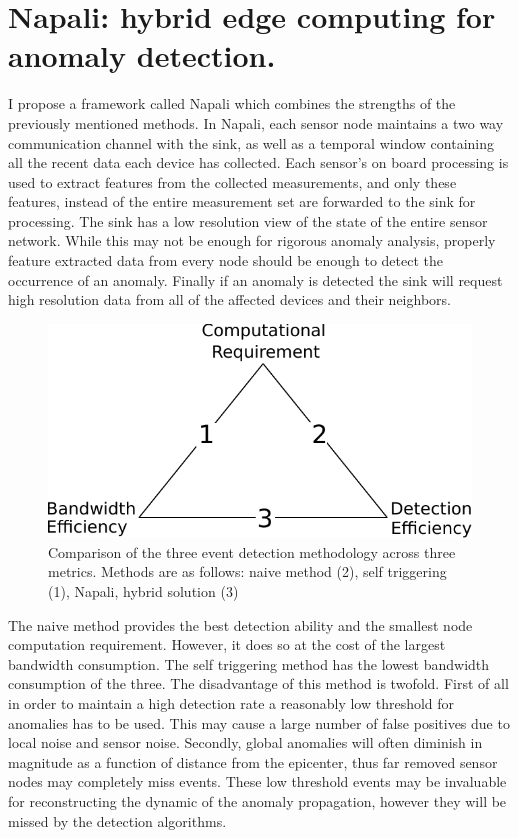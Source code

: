 \section{Napali: hybrid edge computing for anomaly detection.} \label{intro:section:napali}
  
I propose a framework called Napali which combines the strengths of the previously mentioned methods. In Napali, each sensor node maintains a two way communication channel with the sink, as well as a temporal window containing all the recent data each device has collected. Each sensor's on board processing is used to extract features from the collected measurements, and only these features, instead of the entire measurement set are forwarded to the sink for processing. The sink has a low resolution view of the state of the entire sensor network. While this may not be enough for rigorous anomaly analysis, properly feature extracted data from every node should be enough to detect the occurrence of an anomaly. Finally if an anomaly is detected the sink will request high resolution data from all of the affected devices and their neighbors. 

\begin{figure}[h]
	  \centering
	  \includegraphics[width=0.5\linewidth]{img/edge_computing_vs.pdf}
	\caption{Comparison of the three event detection methodology across three metrics. Methods are as follows: naive method (2), self triggering (1), Napali, hybrid solution (3)}
	\label{intro:fig:edge}
\end{figure}
The naive method provides the best detection ability and the smallest node computation requirement. However, it does so at the cost of the largest bandwidth consumption. The self triggering method has the lowest bandwidth consumption of the three. The disadvantage of this method is twofold. First of all in order to maintain a high detection rate a reasonably low threshold for anomalies has to be used. This may cause a large number of false positives due to local noise and sensor noise. Secondly, global anomalies will often diminish in magnitude as a function of distance from the epicenter, thus far removed sensor nodes may completely miss events. These low threshold events may be invaluable for reconstructing the dynamic of the anomaly propagation, however they will be missed by the detection algorithms. 

